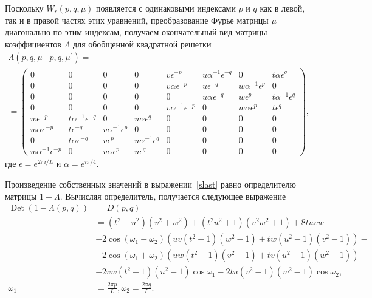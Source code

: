 \documentclass[utf8,12pt]{jetp}
\DeclareMathOperator{\Det}{Det}
\begin{document}
Поскольку $W_r(p, q, \mu)$ появляется с одинаковыми индексами $p$ и $q$ как в левой, так и в правой частях этих уравнений, преобразование Фурье матрицы $\mu$ диагонально по этим индексам, получаем окончательный вид матрицы коэффициентов $\Lambda$ для обобщенной квадратной решетки
\begin{multline}
\Lambda (p, q, \mu\; |\; p, q, \mu^{'}) = \\ =
\begin{pmatrix}
0 \!\!\!& 0 \!\!\!& 0 \!\!\!& 0\!\!\! & v \epsilon^{-p} \!\!\!& u \alpha^{-1} \epsilon^{-q} \!\!\!& 0 \!\!\!& t \alpha \epsilon^{q} \!\!\! \\
0 \!\!\!& 0 \!\!\!& 0 \!\!\!& 0 \!\!\!& v \alpha \epsilon^{-p}\!\!\! & u \epsilon^{-q}\!\!\! & w \alpha^{-1} \epsilon^{p}\!\!\! & 0\!\!\! \\
0 \!\!\!& 0 \!\!\!& 0 \!\!\!& 0\!\!\! & 0\!\!\! & u \alpha \epsilon^{-q} \!\!\!& w \epsilon^{p} \!\!\!& t \alpha^{-1} \epsilon^{q}\!\!\!  \\
0 \!\!\!& 0 \!\!\!& 0 \!\!\!& 0\!\!\! & v \alpha^{-1} \epsilon^{-p}\!\!\! & 0 \!\!\!& w \alpha \epsilon^{p} \!\!\!& t \epsilon^{q}\!\!\!  \\
w \epsilon^{-p} \!\!\!& t \alpha^{-1} \epsilon^{-q} \!\!\!& 0\!\!\! & u \alpha \epsilon^{q}\!\!\! & 0\!\!\! & 0\!\!\! & 0\!\!\! & 0\!\!\!  \\
w \alpha \epsilon^{-p}\!\!\! & t \epsilon^{-q} \!\!\!& v \alpha^{-1} \epsilon^{p}\!\!\! & 0 \!\!\!& 0\!\!\! & 0\!\!\! & 0\!\!\! & 0\!\!\! \\
0 \!\!\!& t \alpha \epsilon^{-q}\!\!\! & v \epsilon^{p} \!\!\!& u \alpha^{-1} \epsilon^{q}\!\!\! & 0 \!\!\!& 0\!\!\! & 0\!\!\! & 0 \!\!\! \\
w \alpha^{-1} \epsilon^{-p}\!\!\! & 0\!\!\! & v \alpha \epsilon^{p}\!\!\! & u \epsilon^{q} \!\!\!& 0\!\!\! & 0\!\!\! & 0 \!\!\!& 0 \!\!\!
\end{pmatrix},
\end{multline}
где $\epsilon = e^{2\pi i/L}$ и $\alpha = e^{i\pi/4}$.

Произведение собственных значений в выражении~\eqref{slast} равно определителю матрицы $1 - \Lambda$. Вычисляя определитель, получается следующее выражение
\begin{align*}
	\Det(1-\Lambda(p, q))& = D(p, q) =\\&= \left(t^2+u^2\right)
	\left(v^2+w^2\right)+\left(t^2 u^2+1\right) \left(v^2 w^2+1\right)+8 t u v w - \\&- 2 \cos (\omega_1-\omega_2) \left( u v \left(t^2-1\right) \left(w^2-1\right)+t w \left(u^2-1\right)
	\left(v^2-1\right) \right) - \\&- 2 \cos (\omega_1+\omega_2) \left( u w \left(t^2-1\right) \left(v^2-1\right) + t v
	\left(u^2-1\right) \left(w^2-1\right)\right)-\\&- 2 v w \left(t^2-1\right) \left(u^2-1\right) \cos \omega_1 - 2 t u \left(v^2-1\right) \left(w^2-1\right) \cos \omega_2,\\ \omega_1 &= \frac{2\pi p}{L}, \omega_2 = \frac{2\pi q}{L}.
\end{align*}
\end{document}
